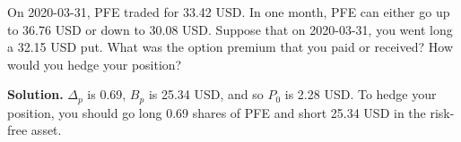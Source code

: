 \noindent On 2020-03-31, PFE traded for 33.42 USD. In one month, PFE can either go up to 36.76 USD or down to 30.08 USD. Suppose that on 2020-03-31, you went long a 32.15 USD put. What was the option premium that you paid or received? How would you hedge your position?

\vspace{9pt}

\noindent\textbf{Solution.} $\Delta_{p}$ is 0.69, $B_{p}$ is 25.34 USD, and so $P_{0}$ is 2.28 USD. To hedge your position, you should go long 0.69 shares of PFE and short 25.34 USD in the risk-free asset.